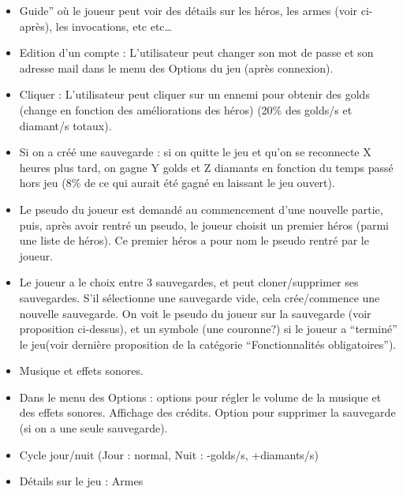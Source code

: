         \begin{itemize}
            \item Guide” où le joueur peut voir des détails sur les héros, les armes (voir ci-après), les invocations, etc etc…

            \item Edition d’un compte : L’utilisateur peut changer son mot de passe et son adresse mail dans le menu des Options du jeu (après connexion).

            \item Cliquer : L’utilisateur peut cliquer sur un ennemi pour obtenir des golds (change en fonction des améliorations des héros) (20\% des golds/s et diamant/s totaux).

            \item Si on a créé une sauvegarde : si on quitte le jeu et qu’on se reconnecte X heures plus tard, on gagne Y golds et Z diamants en fonction du temps passé hors jeu (8\% de ce qui aurait été gagné en laissant le jeu ouvert).

            \item Le pseudo du joueur est demandé au commencement d’une nouvelle partie, puis, après avoir rentré un pseudo, le joueur choisit un premier héros (parmi une liste de héros). Ce premier héros a pour nom le pseudo rentré par le joueur.

            \item Le joueur a le choix entre 3 sauvegardes, et peut cloner/supprimer ses sauvegardes. S’il sélectionne une sauvegarde vide, cela crée/commence une nouvelle sauvegarde. On voit le pseudo du joueur sur la sauvegarde (voir proposition ci-dessus), et un symbole (une couronne?) si le joueur a “terminé” le jeu(voir dernière proposition de la catégorie “Fonctionnalités obligatoires”).

            \item Musique et effets sonores.

            \item Dans le menu des Options : options pour régler le volume de la musique et des effets sonores. Affichage des crédits. Option pour supprimer la sauvegarde (si on a une seule sauvegarde).

            \item Cycle jour/nuit (Jour : normal, Nuit : -golds/s, +diamants/s)

            \item Détails sur le jeu : Armes

            \begin{itemize}


\end{itemize}
\end{itemize}
